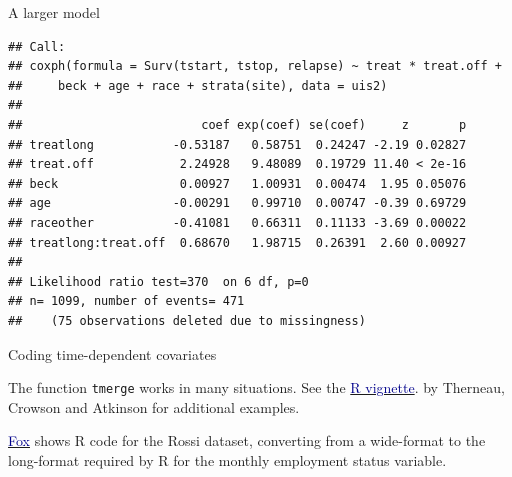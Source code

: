 \documentclass[ignorenonframetext,]{beamer}
\begin{document}
\begin{frame}[fragile]{%
\protect\hypertarget{a-larger-model}{%
A larger model}}

\footnotesize

\begin{verbatim}
## Call:
## coxph(formula = Surv(tstart, tstop, relapse) ~ treat * treat.off + 
##     beck + age + race + strata(site), data = uis2)
## 
##                         coef exp(coef) se(coef)     z       p
## treatlong           -0.53187   0.58751  0.24247 -2.19 0.02827
## treat.off            2.24928   9.48089  0.19729 11.40 < 2e-16
## beck                 0.00927   1.00931  0.00474  1.95 0.05076
## age                 -0.00291   0.99710  0.00747 -0.39 0.69729
## raceother           -0.41081   0.66311  0.11133 -3.69 0.00022
## treatlong:treat.off  0.68670   1.98715  0.26391  2.60 0.00927
## 
## Likelihood ratio test=370  on 6 df, p=0
## n= 1099, number of events= 471 
##    (75 observations deleted due to missingness)
\end{verbatim}

\end{frame}

\begin{frame}{%
\protect\hypertarget{coding-time-dependent-covariates}{%
Coding time-dependent covariates}}

The function \texttt{tmerge} works in many situations. See the
\href{../../methods_papers/t_therneau_time_dependent.pdf}{\textcolor{darkblue}{R vignette}}.
by Therneau, Crowson and Atkinson for additional examples.

\href{../../methods_papers/j_fox_rossi_time_dependent.pdf}{\textcolor{darkblue}{Fox}}
shows \textsf{R} code for the Rossi dataset, converting from a
wide-format to the long-format required by \textsf{R} for the monthly
employment status variable.

\end{frame}
\end{document}
